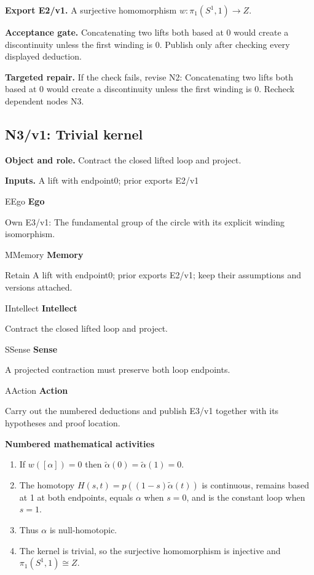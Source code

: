 \documentclass[preprint,12pt,aps,pra,showkeys,amsmath,amssymb,superscriptaddress,floatfix]{revtex4-2}
\theoremstyle{definition}
\theoremstyle{remark}
\newcommand{\mmfaculty}[3]{%
 \begin{mmfacultybox}{#1}{#2}
 {\sffamily\bfseries\color{MMBlue}#2}\par\smallskip #3
 \end{mmfacultybox}}
\newcommand{\field}[2]{\par\smallskip\noindent\textbf{#1.} #2\par}
\begin{document}
\field{Export E2/v1}{A surjective homomorphism \(w:\pi _{1}(S^{1},1)\to Z\).}

\field{Acceptance gate}{Concatenating two lifts both based at 0 would create a discontinuity
unless the first winding is 0. Publish only after checking every
displayed deduction.}

\field{Targeted repair}{If the check fails, revise N2: Concatenating two lifts both based at 0
would create a discontinuity unless the first winding is 0. Recheck
dependent nodes N3.}

\clearpage

\subsection{N3/v1: Trivial kernel}

\field{Object and role}{Contract the closed lifted loop and project.}

\field{Inputs}{A lift with endpoint0; prior exports E2/v1}

\mmfaculty{E}{Ego}{Own E3/v1: The fundamental group of the circle with its explicit winding
isomorphism.}

\mmfaculty{M}{Memory}{Retain A lift with endpoint0; prior exports E2/v1; keep their
assumptions and versions attached.}

\mmfaculty{I}{Intellect}{Contract the closed lifted loop and project.}

\mmfaculty{S}{Sense}{A projected contraction must preserve both loop endpoints.}

\mmfaculty{A}{Action}{Carry out the numbered deductions and publish E3/v1 together with its
hypotheses and proof location.}

\smallskip\noindent\textbf{Numbered mathematical activities}

\begin{enumerate}[label=N3.\arabic*,leftmargin=3.4em]

\item If \(w([\alpha ])=0\) then
\(\widetilde{\alpha}(0)=\widetilde{\alpha}(1)=0\).

\item The homotopy \(H(s,t)=p((1-s)\widetilde{\alpha}(t))\) is continuous,
remains based at 1 at both endpoints, equals \(\alpha\) when \(s=0\),
and is the constant loop when \(s=1\).

\item Thus \(\alpha\) is null-homotopic.

\item The kernel is trivial, so the surjective homomorphism is injective and
\(\pi _{1}(S^{1},1)\cong Z\).

\end{enumerate}
\end{document}
